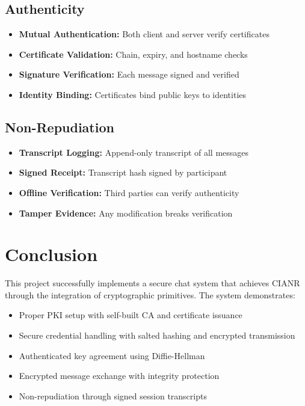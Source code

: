 \documentclass[runningheads]{llncs}
\begin{document}
\subsection{Authenticity}

\begin{itemize}
    \item \textbf{Mutual Authentication:} Both client and server verify certificates
    \item \textbf{Certificate Validation:} Chain, expiry, and hostname checks
    \item \textbf{Signature Verification:} Each message signed and verified
    \item \textbf{Identity Binding:} Certificates bind public keys to identities
\end{itemize}

\subsection{Non-Repudiation}

\begin{itemize}
    \item \textbf{Transcript Logging:} Append-only transcript of all messages
    \item \textbf{Signed Receipt:} Transcript hash signed by participant
    \item \textbf{Offline Verification:} Third parties can verify authenticity
    \item \textbf{Tamper Evidence:} Any modification breaks verification
\end{itemize}

\section{Conclusion}

This project successfully implements a secure chat system that achieves CIANR through the integration of cryptographic primitives. The system demonstrates:

\begin{itemize}
    \item Proper PKI setup with self-built CA and certificate issuance
    \item Secure credential handling with salted hashing and encrypted transmission
    \item Authenticated key agreement using Diffie-Hellman
    \item Encrypted message exchange with integrity protection
    \item Non-repudiation through signed session transcripts
\end{itemize}
\end{document}
